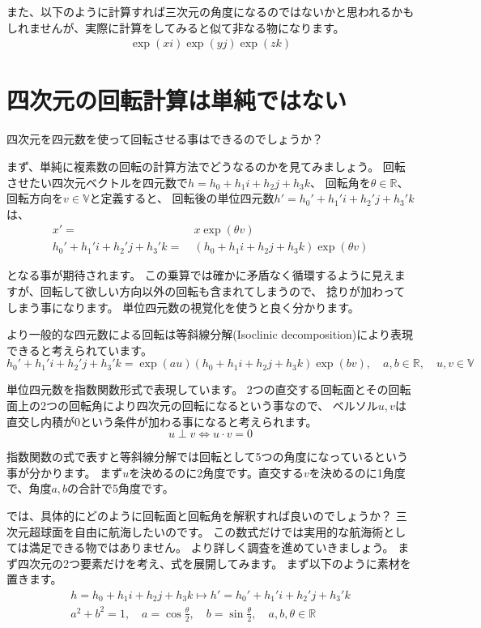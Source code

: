 \documentclass[a4paper,12pt,notitlepage]{jsreport}
\begin{document}
また、以下のように計算すれば三次元の角度になるのではないかと思われるかもしれませんが、実際に計算をしてみると似て非なる物になります。
\begin{gather}
  \exp(xi)\exp(yj)\exp(zk)
\end{gather}

\section{四次元の回転計算は単純ではない}

四次元を四元数を使って回転させる事はできるのでしょうか？

まず、単純に複素数の回転の計算方法でどうなるのかを見てみましょう。
回転させたい四次元ベクトルを四元数で$h=h_0+h_1i+h_2j+h_3k$、
回転角を$\theta\in\mathbb{R}$、回転方向を$v\in\mathbb{V}$と定義すると、
回転後の単位四元数$h'=h_0'+h_1'i+h_2'j+h_3'k$は、
\begin{equation}
  \begin{split}
    x'=~&x\exp(\theta v)\\
    h_0'+h_1'i+h_2'j+h_3'k=~&(h_0+h_1i+h_2j+h_3k)\exp(\theta v)
  \end{split}
\end{equation}

となる事が期待されます。
この乗算では確かに矛盾なく循環するように見えますが、回転して欲しい方向以外の回転も含まれてしまうので、
捻りが加わってしまう事になります。
単位四元数の視覚化を使うと良く分かります。

より一般的な四元数による回転は等斜線分解(Isoclinic decomposition)により表現できると考えられています。
\begin{equation}
  h_0'+h_1'i+h_2'j+h_3'k=\exp(au)(h_0+h_1i+h_2j+h_3k)\exp(bv),\quad a,b\in\mathbb{R},\quad u,v\in\mathbb{V}
\end{equation}

単位四元数を指数関数形式で表現しています。
2つの直交する回転面とその回転面上の2つの回転角により四次元の回転になるという事なので、
ベルソル$u,v$は直交し内積が$0$という条件が加わる事になると考えられます。
\begin{equation}
  u \perp v \iff u \cdot v=0
\end{equation}

指数関数の式で表すと等斜線分解では回転として5つの角度になっているという事が分かります。
まず$u$を決めるのに2角度です。直交する$v$を決めるのに1角度で、角度$a,b$の合計で5角度です。

では、具体的にどのように回転面と回転角を解釈すれば良いのでしょうか？
三次元超球面を自由に航海したいのです。
この数式だけでは実用的な航海術としては満足できる物ではありません。
より詳しく調査を進めていきましょう。
まず四次元の2つ要素だけを考え、式を展開してみます。
まず以下のように素材を置きます。
\begin{gather}
  h=h_0+h_1i+h_2j+h_3k \mapsto h'=h_0'+h_1'i+h_2'j+h_3'k\\
  a^2+b^2=1,\quad a=\cos\frac{\theta}{2},\quad b=\sin\frac{\theta}{2},
  \quad a,b,\theta\in\mathbb{R}
\end{gather}
\end{document}
